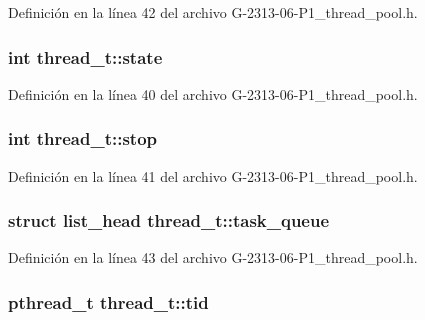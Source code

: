 Definición en la línea 42 del archivo G-\/2313-\/06-\/\+P1\+\_\+thread\+\_\+pool.\+h.

\subsubsection[{\texorpdfstring{state}{state}}]{\setlength{\rightskip}{0pt plus 5cm}int thread\+\_\+t\+::state}\hypertarget{structthread__t_a3e0780f1c2fc9932258a60b5043fe424}{}\label{structthread__t_a3e0780f1c2fc9932258a60b5043fe424}


Definición en la línea 40 del archivo G-\/2313-\/06-\/\+P1\+\_\+thread\+\_\+pool.\+h.

\subsubsection[{\texorpdfstring{stop}{stop}}]{\setlength{\rightskip}{0pt plus 5cm}int thread\+\_\+t\+::stop}\hypertarget{structthread__t_a8e9f0fd028676d0ebeef8438f2176bb7}{}\label{structthread__t_a8e9f0fd028676d0ebeef8438f2176bb7}


Definición en la línea 41 del archivo G-\/2313-\/06-\/\+P1\+\_\+thread\+\_\+pool.\+h.

\subsubsection[{\texorpdfstring{task\+\_\+queue}{task_queue}}]{\setlength{\rightskip}{0pt plus 5cm}struct {\bf list\+\_\+head} thread\+\_\+t\+::task\+\_\+queue}\hypertarget{structthread__t_a69c932ede0de60b66a482fb735fca966}{}\label{structthread__t_a69c932ede0de60b66a482fb735fca966}


Definición en la línea 43 del archivo G-\/2313-\/06-\/\+P1\+\_\+thread\+\_\+pool.\+h.

\subsubsection[{\texorpdfstring{tid}{tid}}]{\setlength{\rightskip}{0pt plus 5cm}pthread\+\_\+t thread\+\_\+t\+::tid}\hypertarget{structthread__t_a92c076d58ca307499452b8dfe0c4e598}{}\label{structthread__t_a92c076d58ca307499452b8dfe0c4e598}


